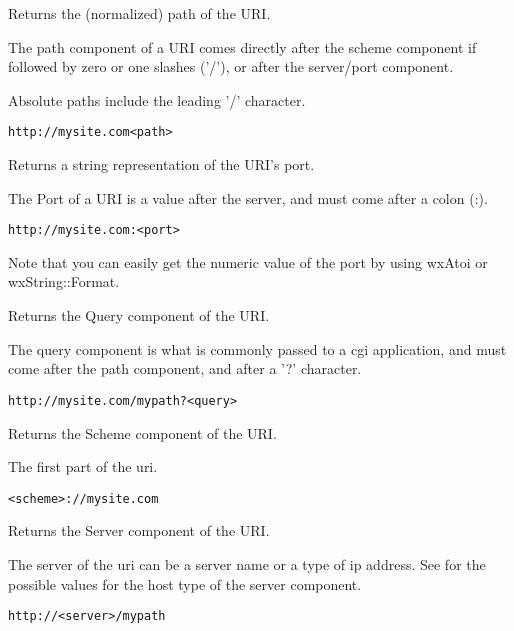 
Returns the (normalized) path of the URI.

The path component of a URI comes
directly after the scheme component
if followed by zero or one slashes ('/'),
or after the server/port component.

Absolute paths include the leading '/'
character.

\tt{http://mysite.com<path>}

\label{wxurigetport}


Returns a string representation of the URI's port.

The Port of a URI is a value after the server, and 
must come after a colon (:).

\tt{http://mysite.com:<port>}

Note that you can easily get the numeric value of the port
by using wxAtoi or wxString::Format.

\label{wxurigetquery}


Returns the Query component of the URI.

The query component is what is commonly passed to a 
cgi application, and must come after the path component,
and after a '?' character.

\tt{http://mysite.com/mypath?<query>}


\label{wxurigetscheme}


Returns the Scheme component of the URI.

The first part of the uri.

\tt{<scheme>://mysite.com}


\label{wxurigetserver}


Returns the Server component of the URI.

The server of the uri can be a server name or 
a type of ip address.  See
 for the
possible values for the host type of the 
server component.

\tt{http://<server>/mypath}


\label{wxurigetuser}

